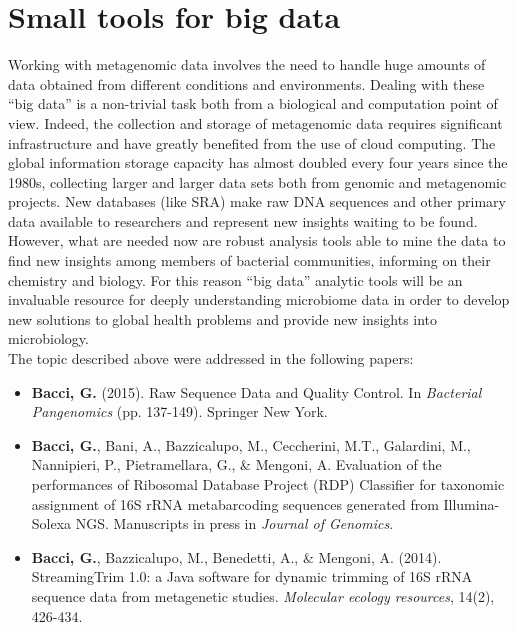 \logvartrue
\chapter{Small tools for big data}
Working with metagenomic data involves the need to handle huge amounts of data obtained from different conditions and environments. Dealing with these ``big data'' is a non-trivial task both from a biological and computation point of view. Indeed, the collection and storage of metagenomic data requires significant infrastructure and have greatly benefited from the use of cloud computing. The global information storage capacity has almost doubled every four years since the 1980s, collecting larger and larger data sets both from genomic and metagenomic projects. New databases (like SRA) make raw DNA sequences and other primary data available to researchers and represent new insights waiting to be found. However, what are needed now are robust analysis tools able to mine the data to find new insights among members of bacterial communities, informing on their chemistry and biology. For this reason ``big data'' analytic tools will be an invaluable resource for deeply understanding microbiome data in order to develop new solutions to global health problems and provide new insights into microbiology.\\
The topic described above were addressed in the following papers:
\vspace{-5mm}
\begin{itemize}[nosep]
\item \textbf{Bacci, G.} (2015). Raw Sequence Data and Quality Control. In \textit{Bacterial Pangenomics} (pp. 137-149). Springer New York.
\item \textbf{Bacci, G.}, Bani, A., Bazzicalupo, M., Ceccherini, M.T., Galardini, M., Nannipieri, P., Pietramellara, G., \& Mengoni, A. Evaluation of the performances of Ribosomal Database Project (RDP) Classifier for taxonomic assignment of 16S rRNA metabarcoding sequences generated from Illumina-Solexa NGS. Manuscripts in press in \textit{Journal of Genomics}.
\item \textbf{Bacci, G.}, Bazzicalupo, M., Benedetti, A., \& Mengoni, A. (2014). StreamingTrim 1.0: a Java software for dynamic trimming of 16S rRNA sequence data from metagenetic studies. \textit{Molecular ecology resources}, 14(2), 426-434.
\end{itemize}


